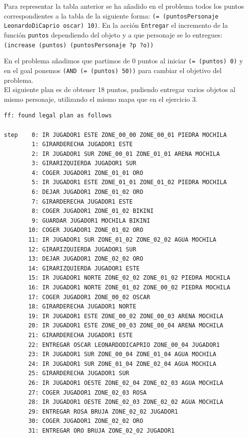 \documentclass[12pt]{article}
\begin{document}
Para representar la tabla anterior se ha añadido en el problema todos los puntos correspondientes a la tabla de la siguiente forma: \texttt{(= (puntosPersonaje LeonardoDiCaprio oscar) 10)}. En la acción \texttt{Entregar} el incremento de la función \texttt{puntos} dependiendo del objeto y a que personaje se lo entregues:
\texttt{(increase (puntos) (puntosPersonaje ?p ?o))}

En el problema añadimos que partimos de 0 puntos al iniciar \texttt{(= (puntos) 0)} y en el goal ponemos \texttt{(AND (= (puntos) 50))} para cambiar el objetivo del problema.\\

El siguiente plan es de obtener 18 puntos, pudiendo entregar varios objetos al mismo personaje, utilizando el mismo mapa que en el ejercicio 3.
\begin{verbatim}
ff: found legal plan as follows

step    0: IR JUGADOR1 ESTE ZONE_00_00 ZONE_00_01 PIEDRA MOCHILA
        1: GIRARDERECHA JUGADOR1 ESTE
        2: IR JUGADOR1 SUR ZONE_00_01 ZONE_01_01 ARENA MOCHILA
        3: GIRARIZQUIERDA JUGADOR1 SUR
        4: COGER JUGADOR1 ZONE_01_01 ORO
        5: IR JUGADOR1 ESTE ZONE_01_01 ZONE_01_02 PIEDRA MOCHILA
        6: DEJAR JUGADOR1 ZONE_01_02 ORO
        7: GIRARDERECHA JUGADOR1 ESTE
        8: COGER JUGADOR1 ZONE_01_02 BIKINI
        9: GUARDAR JUGADOR1 MOCHILA BIKINI
       10: COGER JUGADOR1 ZONE_01_02 ORO
       11: IR JUGADOR1 SUR ZONE_01_02 ZONE_02_02 AGUA MOCHILA
       12: GIRARIZQUIERDA JUGADOR1 SUR
       13: DEJAR JUGADOR1 ZONE_02_02 ORO
       14: GIRARIZQUIERDA JUGADOR1 ESTE
       15: IR JUGADOR1 NORTE ZONE_02_02 ZONE_01_02 PIEDRA MOCHILA
       16: IR JUGADOR1 NORTE ZONE_01_02 ZONE_00_02 PIEDRA MOCHILA
       17: COGER JUGADOR1 ZONE_00_02 OSCAR
       18: GIRARDERECHA JUGADOR1 NORTE
       19: IR JUGADOR1 ESTE ZONE_00_02 ZONE_00_03 ARENA MOCHILA
       20: IR JUGADOR1 ESTE ZONE_00_03 ZONE_00_04 ARENA MOCHILA
       21: GIRARDERECHA JUGADOR1 ESTE
       22: ENTREGAR OSCAR LEONARDODICAPRIO ZONE_00_04 JUGADOR1
       23: IR JUGADOR1 SUR ZONE_00_04 ZONE_01_04 AGUA MOCHILA
       24: IR JUGADOR1 SUR ZONE_01_04 ZONE_02_04 AGUA MOCHILA
       25: GIRARDERECHA JUGADOR1 SUR
       26: IR JUGADOR1 OESTE ZONE_02_04 ZONE_02_03 AGUA MOCHILA
       27: COGER JUGADOR1 ZONE_02_03 ROSA
       28: IR JUGADOR1 OESTE ZONE_02_03 ZONE_02_02 AGUA MOCHILA
       29: ENTREGAR ROSA BRUJA ZONE_02_02 JUGADOR1
       30: COGER JUGADOR1 ZONE_02_02 ORO
       31: ENTREGAR ORO BRUJA ZONE_02_02 JUGADOR1

\end{verbatim}
\end{document}
